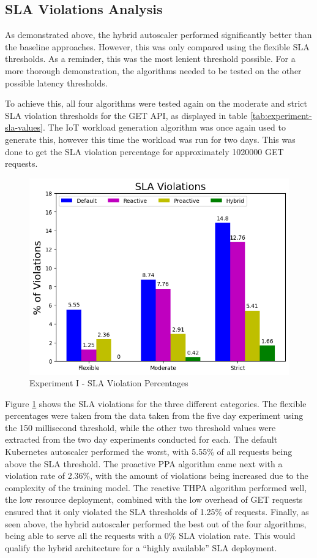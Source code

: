 \subsection{SLA Violations Analysis}
\label{subsec:ch5-exp1-sla-violations}

As demonstrated above, the hybrid autoscaler performed significantly better than the baseline approaches. However, this was only compared using the flexible SLA thresholds. As a reminder, this was the most lenient threshold possible. For a more thorough demonstration, the algorithms needed to be tested on the other possible latency thresholds.\par

To achieve this, all four algorithms were tested again on the moderate and strict SLA violation thresholds for the GET API, as displayed in table \ref{tab:experiment-sla-values}. The IoT workload generation algorithm was once again used to generate this, however this time the workload was run for two days. This was done to get the SLA violation percentage for approximately \num[group-separator={,}]{1020000} GET requests.\par

\begin{figure}[htb]
    \centering
    \caption{Experiment I - SLA Violation Percentages}
    \label{fig:exp1-sla-violation-bar}
    \includegraphics[width=0.6\linewidth]{Figures/Home-Timeline-SLA-Violations.png}
\end{figure}

Figure \ref{fig:exp1-sla-violation-bar} shows the SLA violations for the three different categories. The flexible percentages were taken from the data taken from the five day experiment using the 150 millisecond threshold, while the other two threshold values were extracted from the two day experiments conducted for each. The default Kubernetes autoscaler performed the worst, with 5.55\% of all requests being above the SLA threshold. The proactive PPA algorithm came next with a violation rate of 2.36\%, with the amount of violations being increased due to the complexity of the training model. The reactive THPA algorithm performed well, the low resource deployment, combined with the low overhead of GET requests ensured that it only violated the SLA thresholds of 1.25\% of requests. Finally, as seen above, the hybrid autoscaler performed the best out of the four algorithms, being able to serve all the requests with a 0\% SLA violation rate. This would qualify the hybrid architecture for a ``highly available'' SLA deployment.\par

